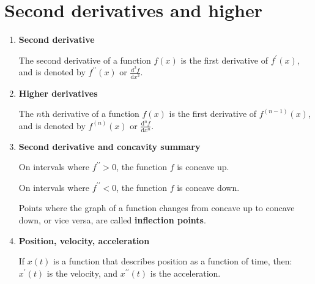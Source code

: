 \section{Second derivatives and higher}
\begin{enumerate}
    \item \textbf{Second derivative}

        The second derivative of a function $f(x)$ is the first derivative of $f^\prime(x)$, and is denoted by $f^{\prime\prime}(x)$ or $\frac{\mathrm{d}^2 f}{\mathrm{d}x^2}$.
    \item \textbf{Higher derivatives}

        The $n$th derivative of a function $f(x)$ is the first derivative of $f^{(n-1)}(x)$, and is denoted by $f^{(n)}(x)$ or $\frac{\mathrm{d}^n f}{\mathrm{d} x^n}$.
    \item \textbf{Second derivative and concavity summary}
        
        On intervals where $f^{\prime\prime}>0$, the function $f$ is concave up.
        \begin{figure}[H]
            \centering
        \end{figure}

        On intervals where $f^{\prime\prime}<0$, the function $f$ is concave down.
        \begin{figure}[H]
            \centering
        \end{figure}

        Points where the graph of a function changes from concave up to concave down, or vice versa, are called \textbf{inflection points}.
    \item \textbf{Position, velocity, acceleration}

        If $x(t)$ is a function that describes position as a function of time, then:
        $x^\prime (t)$ is the velocity, and $x^{\prime\prime} (t)$ is the acceleration.
\end{enumerate}

